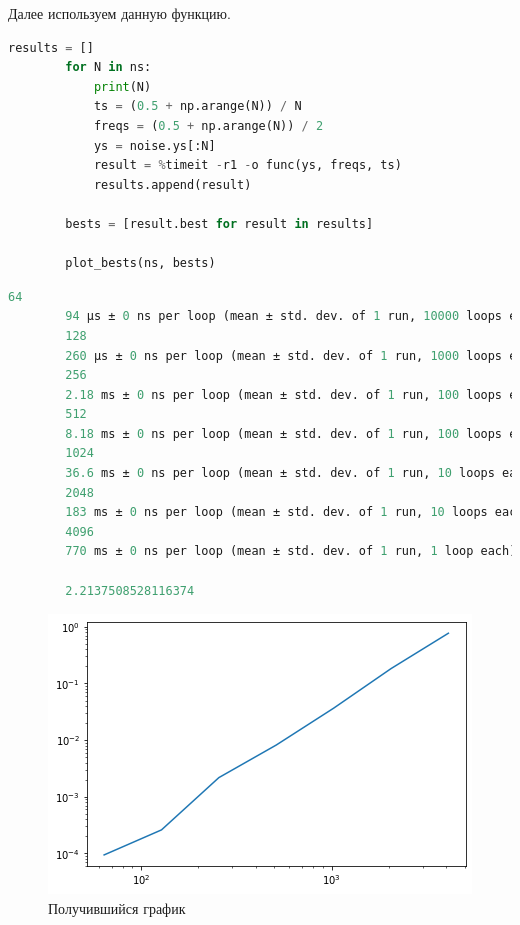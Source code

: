 \documentclass[a4paper, 14pt]{extarticle}
\begin{document}
    Далее используем данную функцию.

    \begin{lstlisting}[language=Python, caption= Тестирование функции, label={lst:test_analyze1}]
        results = []
        for N in ns:
            print(N)
            ts = (0.5 + np.arange(N)) / N
            freqs = (0.5 + np.arange(N)) / 2
            ys = noise.ys[:N]
            result = %timeit -r1 -o func(ys, freqs, ts)
            results.append(result)

        bests = [result.best for result in results]

        plot_bests(ns, bests)
    \end{lstlisting}

    \begin{lstlisting}[language=Python, caption= Получившиеся данные, label={lst:data_1}]
        64
        94 µs ± 0 ns per loop (mean ± std. dev. of 1 run, 10000 loops each)
        128
        260 µs ± 0 ns per loop (mean ± std. dev. of 1 run, 1000 loops each)
        256
        2.18 ms ± 0 ns per loop (mean ± std. dev. of 1 run, 100 loops each)
        512
        8.18 ms ± 0 ns per loop (mean ± std. dev. of 1 run, 100 loops each)
        1024
        36.6 ms ± 0 ns per loop (mean ± std. dev. of 1 run, 10 loops each)
        2048
        183 ms ± 0 ns per loop (mean ± std. dev. of 1 run, 10 loops each)
        4096
        770 ms ± 0 ns per loop (mean ± std. dev. of 1 run, 1 loop each)

        2.2137508528116374
    \end{lstlisting}

    \begin{figure}[H]
        \centering
        \includegraphics[width=0.8\linewidth]{analyze_1_wave}
        \caption{Получившийся график}
        \label{fig:analyze_1_wave}
    \end{figure}
\end{document}

